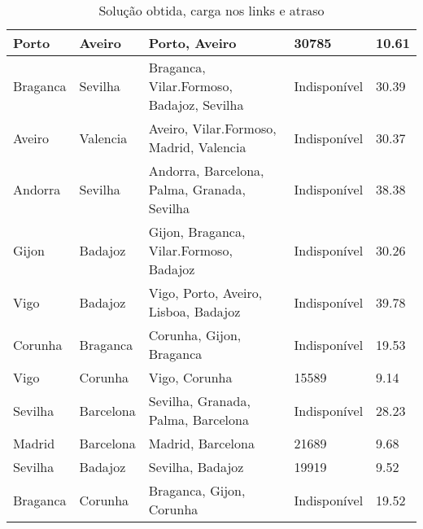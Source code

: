 \begin{table}[!htb]
{\begin{tabular}{|l|l|l|l|l|}
Porto & Aveiro & Porto, Aveiro & 30785 & 10.61 \\ \hline
Braganca & Sevilha & Braganca, Vilar.Formoso, Badajoz, Sevilha & Indisponível & 30.39 \\ \hline
Aveiro & Valencia & Aveiro, Vilar.Formoso, Madrid, Valencia & Indisponível & 30.37 \\ \hline
Andorra & Sevilha & Andorra, Barcelona, Palma, Granada, Sevilha & Indisponível & 38.38 \\ \hline
Gijon & Badajoz & Gijon, Braganca, Vilar.Formoso, Badajoz & Indisponível & 30.26 \\ \hline
Vigo & Badajoz & Vigo, Porto, Aveiro, Lisboa, Badajoz & Indisponível & 39.78 \\ \hline
Corunha & Braganca & Corunha, Gijon, Braganca & Indisponível & 19.53 \\ \hline
Vigo & Corunha & Vigo, Corunha & 15589 & 9.14 \\ \hline
Sevilha & Barcelona & Sevilha, Granada, Palma, Barcelona & Indisponível & 28.23 \\ \hline
Madrid & Barcelona & Madrid, Barcelona & 21689 & 9.68 \\ \hline
Sevilha & Badajoz & Sevilha, Badajoz & 19919 & 9.52 \\ \hline
Braganca & Corunha & Braganca, Gijon, Corunha & Indisponível & 19.52 \\ \hline
\end{tabular}}
\caption[]{Solução obtida, carga nos links e atraso}
\end{table}

